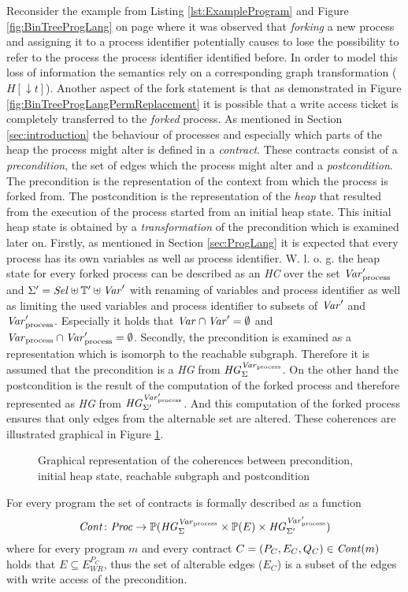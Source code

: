 	Reconsider the example from Listing \ref{lst:ExampleProgram} and Figure
	\ref{fig:BinTreeProgLang} on page \pageref{fig:BinTreeProgLang} where it was
	observed that \emph{forking} a new process and assigning it to a process
	identifier potentially causes to lose the possibility to refer to the
	process the process identifier identified before. In order to model this
	loss of information the semantics rely on a corresponding graph
	transformation ($H[\downarrow t]$). Another aspect of the fork
	statement is that as demonstrated in Figure
	\ref{fig:BinTreeProgLangPermReplacement} it is possible that a write access
	ticket is completely transferred to the \emph{forked} process. As mentioned
	in Section \ref{sec:introduction} the behaviour of processes and especially
	which parts of the heap the process might alter is defined in a
	\emph{contract}.
	These contracts consist of a \emph{precondition}, the set of edges which the
	process might alter and a \emph{postcondition}.
	The precondition is the representation of the context from which the process
	is forked from. The postcondition is the representation of the
	\emph{heap} that resulted from the execution of the process started from an
	initial heap state.
	This initial heap state is obtained by a \emph{transformation} of the
	precondition which is examined later on.
	Firstly, as mentioned in Section \ref{sec:ProgLang} it is expected
	that every process has its own variables as well as process identifier.
	W. l. o. g. the heap state for every forked process can be described as an
	\emph{\ac{HC}} over the set $\mathit{Var}_{\text{process}}'$ and
	$\Sigma' = \mathit{Sel}\uplus\mathbb{T}'\uplus\mathit{Var}'$ with renaming of variables and
	process identifier as well as limiting the used variables and process
	identifier to subsets of $\mathit{Var}'$ and $\mathit{Var}_{\text{process}}'$. Especially it holds that
	$\mathit{Var}\cap\mathit{Var}'=\emptyset$ and $\mathit{Var}_{\text{process}}\cap\mathit{Var}_{\text{process}}'=\emptyset$.
	Secondly, the precondition is examined as a representation which is isomorph
	to the reachable subgraph. Therefore it is assumed that the precondition is
	a \emph{\ac{HG}} from $\mathit{HG}_{\Sigma}^{\mathit{Var}_{\text{process}}}$. On the other hand the postcondition is the
	result of the computation of the forked process and therefore represented as
	\emph{\ac{HG}} from $\mathit{HG}_{\Sigma'}^{\mathit{Var}_{\text{process}}'}$. And this computation of
	the forked process ensures that only edges from the alternable set are
	altered. These coherences are illustrated graphical in Figure
	\ref{fig:forkHeaps}.
	\begin{figure}[ht]
		\begin{center}
			
		\end{center}
		\caption{Graphical representation of the coherences between precondition,
		initial heap state, reachable subgraph and postcondition}
		\label{fig:forkHeaps}
	\end{figure}
	For every program the set of contracts is formally described as a function
	\begin{equation*}
		\mathit{Cont}\colon\mathit{Proc}\rightarrow
		\mathbb{P}(\mathit{HG}_{\Sigma}^{\mathit{Var}_{\text{process}}}\times\mathbb{P}(E)\times\mathit{HG}_{\Sigma'}^{\mathit{Var}_{\text{process}}'})
	\end{equation*}
	where for every program $m$ and every contract $C=(P_C, E_C, Q_C)\in
	\mathit{Cont}(m)$ holds that $E\subseteq E^{P_C}_{\mathit{WR}}$, thus the set of
	alterable edges ($E_{C}$) is a subset of the edges with write access of the
	precondition. 

